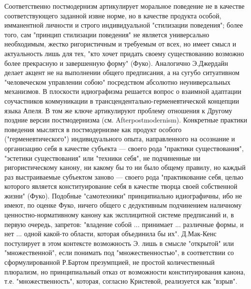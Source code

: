 \documentclass[12pt]{article}
\begin{document}
Соответственно постмодернизм артикулирует моральное поведение не в качестве соответствующего заданной
извне норме, но в качестве продукта особой, имманентной личности и строго индивидуальной "стилизации
поведения"; более того, сам "принцип стилизации поведения" не является универсально необходимым, жестко
ригористичным и требуемым от всех, но имеет смысл и актуальность лишь для тех, "кто хочет придать своему
существованию возможно более прекрасную и завершенную форму" (Фуко). Аналогично Э.Джердайн делает
акцент не на выполнении общего предписания, а на сугубо ситуативном "человеческом управлении собою"
посредством абсолютно неуниверсальных механизмов. В плоскости идиографизма решается вопрос о взаимной
адаптации соучастников коммуникации в трансцендентально-герменевтической концепции языка Апеля. В том
же  ключе  артикулируют  проблему  отношения  к  Другому  поздние  версии  постмодернизма  (см.  Afterpostmodernism).  Конкретные  практики  поведения  мыслятся  в  постмодернизме  как  продукт  особого
("герменевтического") индивидуального опыта, направленного на осознание и организацию себя в качестве
субъекта  —  своего  рода  "практики  существования",  "эстетики  существования"  или  "техники  себя",  не
подчиненные  ни  ригористическому  канону,  ни  какому  бы  то  ни  было  общему  правилу,  но  каждый  раз
выстраиваемые  субъектом  заново  —  своего  рода  "практикование  себя,  целью  которого  является
конституирование  себя  в  качестве  творца  своей  собственной  жизни"  (Фуко).  Подобные  "самотехники"
принципиально идиографичны, ибо не имеют, по оценке Фуко, ничего общего с дедуктивным подчинением
наличному  ценностно-нормативному  канону  как  эксплицитной  системе  предписаний  и,  в  первую  очередь,
запретов:  "владение  собой  ...  принимает  ...  различные  формы,  и  нет  ...  одной  какой-то  области,  которая
объединила бы их". Д.Мак-Кенс постулирует в этом контексте возможность Э. лишь в смысле "открытой" или
"множественной",  если  понимать  под  "множественностью",  в  соответствии  со  сформулированной  Р.Бартом
презумпцией,  не  простой  количественный  плюрализм,  но  принципиальный  отказ  от  возможности
конституирования канона, т.е. "множественность", которая, согласно Кристевой, реализуется как "взрыв".

\newpage
\end{document}
